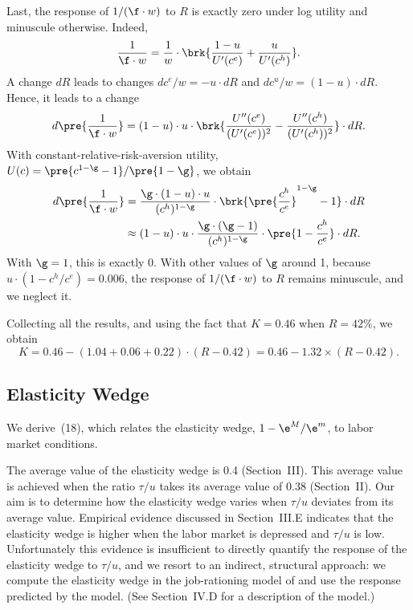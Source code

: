 \documentclass[letterpaper,12pt,leqno]{article}
\begin{document}
Last, the response of $1/(\f\cdot w)$ to $R$ is exactly zero under log utility and minuscule otherwise. Indeed,
\begin{equation*}
\frac{1}{\f \cdot w}=\frac{1}{w}\cdot\brk{\frac{1-u}{U'(c^e)}+\frac{u}{U'(c^h)}}.
\end{equation*}
A change $dR$ leads to changes $dc^e/w=-u \cdot dR$ and $dc^u/w=(1-u)\cdot dR$. Hence, it leads to a change
\begin{equation*}
d\pre{\frac{1}{\f \cdot w}}=(1-u) \cdot u \cdot \brk{\frac{U''(c^e)}{(U'(c^e))^2}-\frac{U''(c^h)}{(U'(c^h))^2}} \cdot dR.
\end{equation*}
With constant-relative-risk-aversion utility, $U(c)=\pre{c^{1-\g}-1}/\pre{1-\g}$, we obtain
\begin{align*}
d\pre{\frac{1}{\f \cdot w}}&=\frac{\g \cdot (1-u)  \cdot  u}{(c^h)^{1-\g}} \cdot \brk{\pre{\frac{c^h}{c^e}}^{1-\g}-1}\cdot dR \\
&\approx (1-u)  \cdot  u \cdot \frac{\g \cdot (\g-1)}{(c^h)^{1-\g}} \cdot \pre{1-\frac{c^h}{c^e}}\cdot dR.
\end{align*}
With $\g=1$, this is exactly 0. With other values of $\g$ around 1, because $u \cdot (1-c^h/c^e) = 0.006$, the response of $1/(\f\cdot w)$ to $R$ remains minuscule, and we neglect it.

Collecting all the results, and using the fact that $K=0.46$ when $R=42\%$, we obtain
\begin{equation}
K =0.46-(1.04+0.06+0.22)\cdot (R-0.42)=0.46-1.32\times (R-0.42).
\label{eq:dupe}\end{equation}

\subsection{Elasticity Wedge}

We derive~(18), which relates the elasticity wedge, $1-\e^M/\e^m$, to labor market conditions.

The average value of the elasticity wedge is 0.4 (Section~III). This average value is achieved when the ratio $\tau/u$ takes its average value of 0.38 (Section~II). Our aim is to determine how the elasticity wedge varies when $\tau/u$ deviates from its average value. Empirical evidence discussed in Section~III.E indicates that the elasticity wedge is higher when the labor market is depressed  and $\tau/u$ is low. Unfortunately this evidence is insufficient to directly quantify the response of the elasticity wedge to $\tau/u$, and we resort to an indirect, structural approach: we compute the elasticity wedge in the job-rationing model of \citet{M09} and use the response predicted by the model. (See Section~IV.D for a description of the model.)
\end{document}
